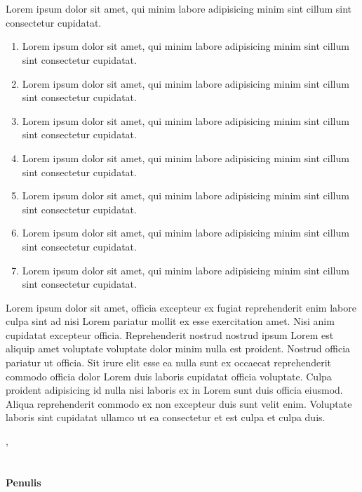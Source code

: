 \makeatletter
\def\preface{%
	\chapter*{\prefacename}%
}
\makeatother

\preface

Lorem ipsum dolor sit amet, qui minim labore adipisicing minim sint cillum sint consectetur cupidatat.

\begin{enumerate}
	\item Lorem ipsum dolor sit amet, qui minim labore adipisicing minim sint cillum sint consectetur cupidatat.
	\item Lorem ipsum dolor sit amet, qui minim labore adipisicing minim sint cillum sint consectetur cupidatat.
	\item Lorem ipsum dolor sit amet, qui minim labore adipisicing minim sint cillum sint consectetur cupidatat.
	\item Lorem ipsum dolor sit amet, qui minim labore adipisicing minim sint cillum sint consectetur cupidatat.
	\item Lorem ipsum dolor sit amet, qui minim labore adipisicing minim sint cillum sint consectetur cupidatat.
	\item Lorem ipsum dolor sit amet, qui minim labore adipisicing minim sint cillum sint consectetur cupidatat.
	\item Lorem ipsum dolor sit amet, qui minim labore adipisicing minim sint cillum sint consectetur cupidatat.
\end{enumerate}

Lorem ipsum dolor sit amet, officia excepteur ex fugiat reprehenderit enim labore culpa sint ad nisi Lorem pariatur mollit ex esse exercitation amet. Nisi anim cupidatat excepteur officia. Reprehenderit nostrud nostrud ipsum Lorem est aliquip amet voluptate voluptate dolor minim nulla est proident. Nostrud officia pariatur ut officia. Sit irure elit esse ea nulla sunt ex occaecat reprehenderit commodo officia dolor Lorem duis laboris cupidatat officia voluptate. Culpa proident adipisicing id nulla nisi laboris ex in Lorem sunt duis officia eiusmod. Aliqua reprehenderit commodo ex non excepteur duis sunt velit enim. Voluptate laboris sint cupidatat ullamco ut ea consectetur et est culpa et culpa duis.

\vspace{0.1cm}

\hspace*{\fill} \makeatletter\@city, \@examdate\makeatother
\\
\\
\\
\hspace*{\fill}\textbf{Penulis}
